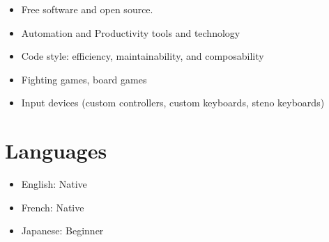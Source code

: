 \documentclass{res}
\newcommand{\inEnglish}[1]{#1}
\begin{document}
\begin{resume}
\inEnglish{
	\vspace{6pt}
	\begin{itemize} \itemsep -2pt
		\item Free software and open source.
		\item Automation and Productivity tools and technology
		\item Code style: efficiency, maintainability, and composability
		\item Fighting games, board games
		\item Input devices (custom controllers, custom keyboards, steno keyboards)
	\end{itemize}
}

\inEnglish{
	\section{Languages}
}
\vspace{6pt}

\inEnglish{
	\vspace{6pt}
	\begin{itemize} \itemsep -2pt
		\item English: Native
		\item French: Native
		\item Japanese: Beginner
	\end{itemize}
}


\end{resume}
\end{document}
